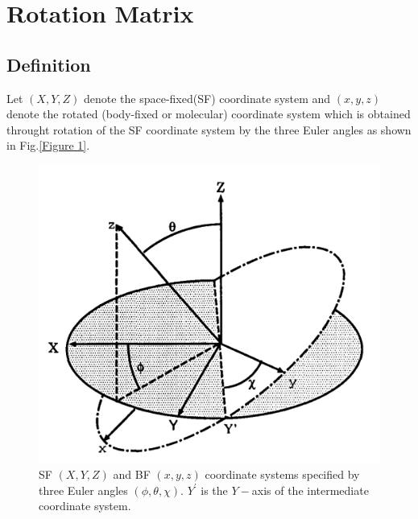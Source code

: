 \documentclass[]{article}
\begin{document}
\section{Rotation Matrix}
\subsection{Definition}

Let $(X,Y,Z)$ denote the space-fixed(SF) coordinate system and $(x,y,z)$ denote the rotated (body-fixed or molecular) coordinate system which is obtained throught rotation of the SF coordinate system by the three Euler angles as shown in Fig.\eqref{Figure 1}. 
\begin{figure}[H]
	\centering
	\includegraphics[scale=0.2]{1.png}
	\caption{SF $(X,Y,Z)$ and BF $(x,y,z)$ coordinate systems specified by three Euler angles $(\phi,\theta,\chi)$. $Y^\prime$ is the $Y-$axis of the intermediate coordinate system.}
	\label{Figure 1}
\end{figure}
\end{document}
